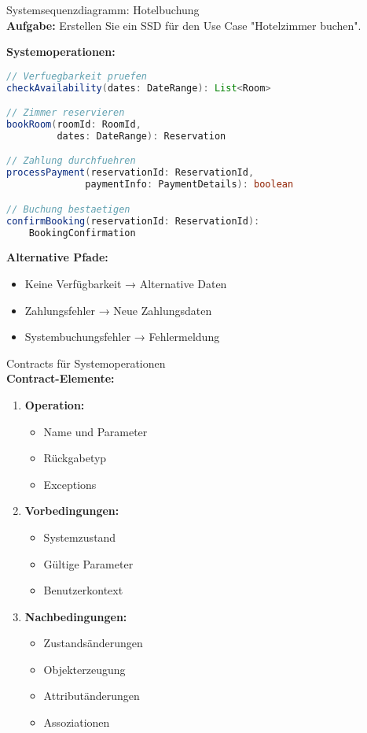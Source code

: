 \begin{example2}{Systemsequenzdiagramm: Hotelbuchung}\\
\textbf{Aufgabe:} Erstellen Sie ein SSD für den Use Case "Hotelzimmer buchen".

\textbf{Systemoperationen:}
\begin{lstlisting}[language=Java, style=base]
// Verfuegbarkeit pruefen
checkAvailability(dates: DateRange): List<Room>

// Zimmer reservieren
bookRoom(roomId: RoomId, 
         dates: DateRange): Reservation

// Zahlung durchfuehren
processPayment(reservationId: ReservationId,
              paymentInfo: PaymentDetails): boolean

// Buchung bestaetigen
confirmBooking(reservationId: ReservationId): 
    BookingConfirmation
\end{lstlisting}

\textbf{Alternative Pfade:}
\begin{itemize}
    \item Keine Verfügbarkeit → Alternative Daten
    \item Zahlungsfehler → Neue Zahlungsdaten
    \item Systembuchungsfehler → Fehlermeldung
\end{itemize}
\end{example2}

\begin{KR}{Contracts für Systemoperationen}\\
\textbf{Contract-Elemente:}
\begin{enumerate}
    \item \textbf{Operation:}
    \begin{itemize}
        \item Name und Parameter
        \item Rückgabetyp
        \item Exceptions
    \end{itemize}
    
    \item \textbf{Vorbedingungen:}
    \begin{itemize}
        \item Systemzustand
        \item Gültige Parameter
        \item Benutzerkontext
    \end{itemize}
    
    \item \textbf{Nachbedingungen:}
    \begin{itemize}
        \item Zustandsänderungen
        \item Objekterzeugung
        \item Attributänderungen
        \item Assoziationen
    \end{itemize}
\end{enumerate}
\end{KR}

